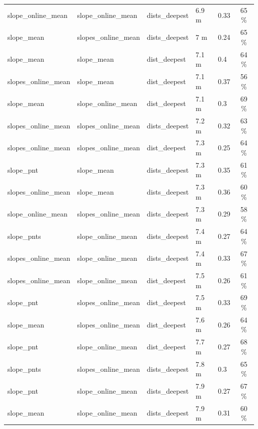 \documentclass[draft,wrr]{agutexSI2019}
\begin{document}
\begin{table}
\begin{tabular}{lllllc}
slope\_online\_mean & slope\_online\_mean & dists\_deepest & 6.9 m & 0.33 & 65 \%\\
slope\_mean & slopes\_online\_mean & dists\_deepest & 7 m & 0.24 & 65 \%\\
slope\_mean & slope\_mean & dist\_deepest & 7.1 m & 0.4 & 64 \%\\
slopes\_online\_mean & slope\_mean & dist\_deepest & 7.1 m & 0.37 & 56 \%\\
slope\_mean & slope\_online\_mean & dist\_deepest & 7.1 m & 0.3 & 69 \%\\
slopes\_online\_mean & slopes\_online\_mean & dists\_deepest & 7.2 m & 0.32 & 63 \%\\
slopes\_online\_mean & slopes\_online\_mean & dist\_deepest & 7.3 m & 0.25 & 64 \%\\
slope\_pnt & slope\_mean & dists\_deepest & 7.3 m & 0.35 & 61 \%\\
slopes\_online\_mean & slope\_mean & dists\_deepest & 7.3 m & 0.36 & 60 \%\\
slope\_online\_mean & slopes\_online\_mean & dists\_deepest & 7.3 m & 0.29 & 58 \%\\
slope\_pnts & slope\_online\_mean & dists\_deepest & 7.4 m & 0.27 & 64 \%\\
slopes\_online\_mean & slope\_online\_mean & dists\_deepest & 7.4 m & 0.33 & 67 \%\\
slopes\_online\_mean & slope\_online\_mean & dist\_deepest & 7.5 m & 0.26 & 61 \%\\
slope\_pnt & slopes\_online\_mean & dist\_deepest & 7.5 m & 0.33 & 69 \%\\
slope\_mean & slopes\_online\_mean & dist\_deepest & 7.6 m & 0.26 & 64 \%\\
slope\_pnt & slope\_online\_mean & dist\_deepest & 7.7 m & 0.27 & 68 \%\\
slope\_pnts & slopes\_online\_mean & dists\_deepest & 7.8 m & 0.3 & 65 \%\\
slope\_pnt & slope\_online\_mean & dists\_deepest & 7.9 m & 0.27 & 67 \%\\
slope\_mean & slope\_online\_mean & dists\_deepest & 7.9 m & 0.31 & 60 \%\\
\hline
\end{tabular}
\end{table}

\end{document}
